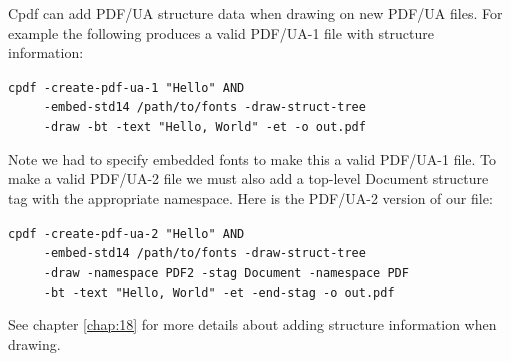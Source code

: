 \documentclass{book}
\begin{document}
Cpdf can add PDF/UA structure data when drawing on new PDF/UA files. For example the following produces a valid PDF/UA-1 file with structure information:

\begin{framed}
   \noindent\small\verb!cpdf -create-pdf-ua-1 "Hello" AND!\\
   \noindent\small\verb!     -embed-std14 /path/to/fonts -draw-struct-tree!\\
   \noindent\small\verb!     -draw -bt -text "Hello, World" -et -o out.pdf!
\end{framed}

\noindent Note we had to specify embedded fonts to make this a valid PDF/UA-1 file. To make a valid PDF/UA-2 file we must also add a top-level Document structure tag with the appropriate namespace. Here is the PDF/UA-2 version of our file:

\begin{framed}
   \noindent\small\verb!cpdf -create-pdf-ua-2 "Hello" AND !\\
   \noindent\small\verb!     -embed-std14 /path/to/fonts -draw-struct-tree!\\
   \noindent\small\verb!     -draw -namespace PDF2 -stag Document -namespace PDF!\\
   \noindent\small\verb!     -bt -text "Hello, World" -et -end-stag -o out.pdf!
\end{framed}

\noindent See chapter \ref{chap:18} for more details about adding structure information when drawing.

\clearpage\pagestyle{empty}
\end{document}
